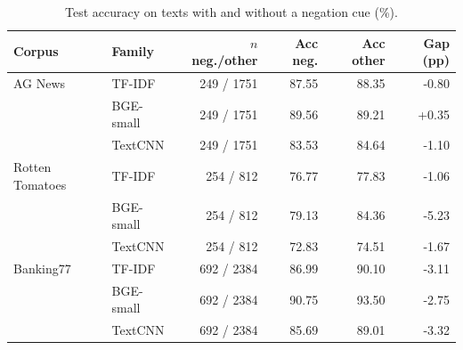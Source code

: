 \begin{table}[H]
\centering
\small
\caption{Test accuracy on texts with and without a negation cue (\%).}\label{tab:negation}
\begin{tabular}{@{}llrrrr@{}}
\toprule
Corpus & Family & $n$ neg./other & Acc neg. & Acc other & Gap (pp) \\
\midrule
AG News & TF-IDF & 249 / 1751 & 87.55 & 88.35 & -0.80 \\
 & BGE-small & 249 / 1751 & 89.56 & 89.21 & +0.35 \\
 & TextCNN & 249 / 1751 & 83.53 & 84.64 & -1.10 \\
Rotten Tomatoes & TF-IDF & 254 / 812 & 76.77 & 77.83 & -1.06 \\
 & BGE-small & 254 / 812 & 79.13 & 84.36 & -5.23 \\
 & TextCNN & 254 / 812 & 72.83 & 74.51 & -1.67 \\
Banking77 & TF-IDF & 692 / 2384 & 86.99 & 90.10 & -3.11 \\
 & BGE-small & 692 / 2384 & 90.75 & 93.50 & -2.75 \\
 & TextCNN & 692 / 2384 & 85.69 & 89.01 & -3.32 \\
\bottomrule
\end{tabular}
\end{table}
